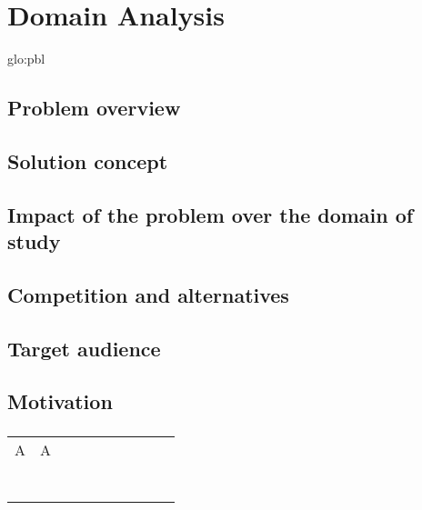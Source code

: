 \chapter{Domain Analysis}

\lipsum[1]
\acrshort{glo:pbl}

\section{Problem overview} \cite{bib:pbl}

\section{Solution concept} \cite{bib:pbl}

\section{Impact of the problem over the domain of study} \cite{bib:pbl}

\section{Competition and alternatives } \cite{bib:pbl}

\section{Target audience} \cite{bib:pbl}

\section{Motivation} \cite{bib:pbl}

\lipsum[2]

\subsection{}

\lipsum[5]



\begin{table}[H]
\begin{tabular}{llllllllll}
                 A & A  &  &  &  &  &  &  &  &  \\
                  &  &  &  &  &  &  &  &  &  \\
                  &  &  &  &  &  &  &  &  &  \\
                  &  &  &  &  &  &  &  &  &  \\
                  &  &  &  &  &  &  &  &  &  \\
                  &  &  &  &  &  &  &  &  &  \\
                  &  &  &  &  &  &  &  &  &  \\
                  &  &  &  &  &  &  &  &  & 
\end{tabular}
\end{table}
\cite{bib:pbl}
